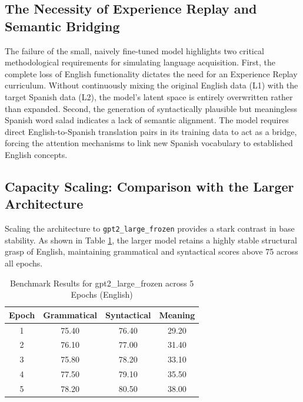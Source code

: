 \subsection{The Necessity of Experience Replay and Semantic Bridging}
The failure of the small, naively fine-tuned model highlights two critical methodological requirements for simulating language acquisition. First, the complete loss of English functionality dictates the need for an Experience Replay curriculum. Without continuously mixing the original English data (L1) with the target Spanish data (L2), the model's latent space is entirely overwritten rather than expanded. Second, the generation of syntactically plausible but meaningless Spanish word salad indicates a lack of semantic alignment. The model requires direct English-to-Spanish translation pairs in its training data to act as a bridge, forcing the attention mechanisms to link new Spanish vocabulary to established English concepts.

\subsection{Capacity Scaling: Comparison with the Larger Architecture}
Scaling the architecture to \texttt{gpt2\_large\_frozen} provides a stark contrast in base stability. As shown in Table \ref{tab:gpt2_large_frozen_en}, the larger model retains a highly stable structural grasp of English, maintaining grammatical and syntactical scores above 75 across all epochs. 

\begin{table}[htpb]
\centering
\caption{Benchmark Results for gpt2\_large\_frozen across 5 Epochs (English)}
\label{tab:gpt2_large_frozen_en}
\begin{tabular}{@{}cccc@{}}
\toprule
\textbf{Epoch} & \textbf{Grammatical} & \textbf{Syntactical} & \textbf{Meaning} \\ \midrule
1              & 75.40                & 76.40                & 29.20            \\
2              & 76.10                & 77.00                & 31.40            \\
3              & 75.80                & 78.20                & 33.10            \\
4              & 77.50                & 79.10                & 35.50            \\
5              & 78.20                & 80.50                & 38.00            \\ \bottomrule
\end{tabular}
\end{table}

